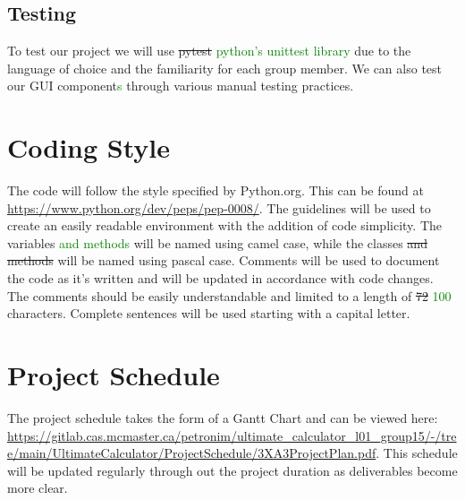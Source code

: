 \documentclass{article}
\begin{document}
\subsection{Testing}
To test our project we will use \sout{pytest} \textcolor{Green}{python's unittest library} due to the language of choice and the familiarity for each group member. We can also test our GUI component\textcolor{Green}{s} through various manual testing practices.


\section{Coding Style}
The code will follow the style specified by Python.org. This can be found at \url{https://www.python.org/dev/peps/pep-0008/}. The guidelines will be used to create an easily readable environment with the addition of code simplicity. The variables \textcolor{Green}{and methods} will be named using camel case, while the classes \sout{and methods} will be named using pascal case. Comments will be used to document the code as it’s written and will be updated in accordance with code changes. The comments should be easily understandable and limited to a length of \sout{72} \textcolor{Green}{100} characters. Complete sentences will be used starting with a capital letter.

\section{Project Schedule}

The project schedule takes the form of a Gantt Chart and can be viewed here: \url{https://gitlab.cas.mcmaster.ca/petronim/ultimate_calculator_l01_group15/-/tree/main/UltimateCalculator/ProjectSchedule/3XA3ProjectPlan.pdf}.
This schedule will be updated regularly through out the project duration as deliverables become more clear.
\end{document}
